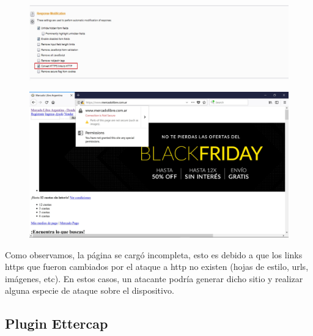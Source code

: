 \documentclass[10pt,a4paper]{article}
\begin{document}
\begin{figure}[H]
\centerline{\includegraphics[scale=1]{images/ssltrip.jpg}}
\caption{}
\end{figure}
\begin{figure}[H]
\centerline{\includegraphics[scale=.2]{images/ml_ssltrip.jpg}}
\caption{}
\end{figure}

Como observamos, la página se cargó incompleta, esto es debido a que los links https que fueron cambiados por el ataque a http no existen (hojas de estilo, urls, imágenes, etc). En estos casos, un atacante podría generar dicho sitio y realizar alguna especie de ataque sobre el dispositivo.

\subsection{Plugin Ettercap}
\end{document}
